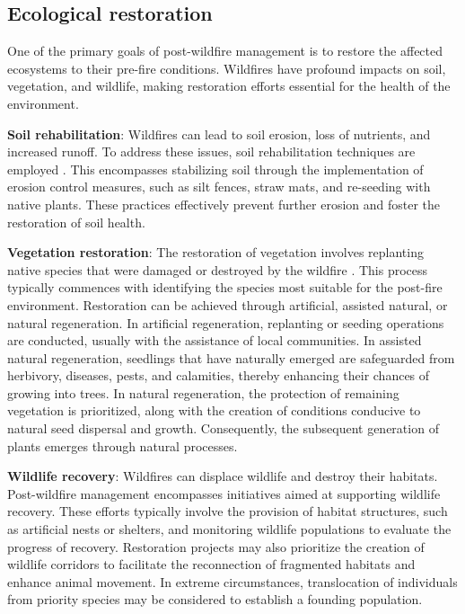 \documentclass[
  12 pt,
]{Nemilov}
\begin{document}
\subsection{Ecological restoration}\label{ecological-restoration}

One of the primary goals of post-wildfire management is to restore the affected ecosystems to their pre-fire conditions. Wildfires have profound impacts on soil, vegetation, and wildlife, making restoration efforts essential for the health of the environment.

\textbf{Soil rehabilitation}: Wildfires can lead to soil erosion, loss of nutrients, and increased runoff. To address these issues, soil rehabilitation techniques are employed \citep{robichaud2009post}. This encompasses stabilizing soil through the implementation of erosion control measures, such as silt fences, straw mats, and re-seeding with native plants. These practices effectively prevent further erosion and foster the restoration of soil health.

\textbf{Vegetation restoration}: The restoration of vegetation involves replanting native species that were damaged or destroyed by the wildfire \citep{long2014science}. This process typically commences with identifying the species most suitable for the post-fire environment. Restoration can be achieved through artificial, assisted natural, or natural regeneration. In artificial regeneration, replanting or seeding operations are conducted, usually with the assistance of local communities. In assisted natural regeneration, seedlings that have naturally emerged are safeguarded from herbivory, diseases, pests, and calamities, thereby enhancing their chances of growing into trees. In natural regeneration, the protection of remaining vegetation is prioritized, along with the creation of conditions conducive to natural seed dispersal and growth. Consequently, the subsequent generation of plants emerges through natural processes.

\textbf{Wildlife recovery}: Wildfires can displace wildlife and destroy their habitats. Post-wildfire management encompasses initiatives aimed at supporting wildlife recovery. These efforts typically involve the provision of habitat structures, such as artificial nests or shelters, and monitoring wildlife populations to evaluate the progress of recovery. Restoration projects may also prioritize the creation of wildlife corridors to facilitate the reconnection of fragmented habitats and enhance animal movement. In extreme circumstances, translocation of individuals from priority species may be considered to establish a founding population.
\end{document}
